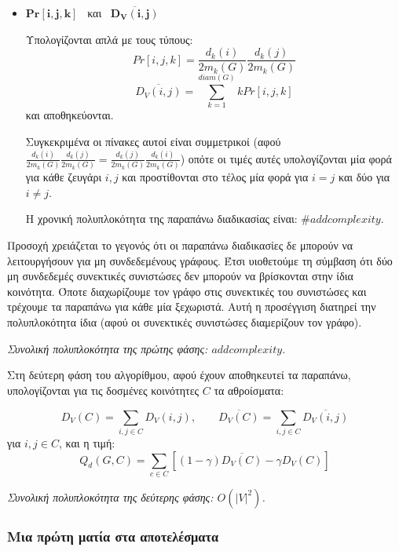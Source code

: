 \documentclass[12pt, letterpaper]{article}
\begin{document}
\begin{itemize}
    \item $\mathbf{Pr[i,j,k]}$  \ και \   $\mathbf{\overline{D_V(i,j)}}$
    
    Υπολογίζονται απλά με τους τύπους:
    \[ Pr[i,j,k] = \frac{d_k(i)}{2m_k(G)} \frac{d_k(j)}{2m_k(G)} \]
    \[ \overline{D_V(i,j)} = \sum_{k=1}^{diam(G)} k Pr[i,j,k] \]
    και αποθηκεύονται. 
    
    Συγκεκριμένα οι πίνακες αυτοί είναι συμμετρικοί (αφού 
    $\frac{d_k(i)}{2m_k(G)} \frac{d_k(j)}{2m_k(G)} = \frac{d_k(j)}{2m_k(G)} \frac{d_k(i)}{2m_k(G)}$)
    οπότε οι τιμές αυτές υπολογίζονται μία φορά για κάθε ζευγάρι $i,j$ και προστίθονται
    στο τέλος μία φορά για $i=j$ και δύο για $i \neq j$.
    
    Η χρονική πολυπλοκότητα της παραπάνω διαδικασίας είναι:
    $\#add complexity$.

    

\end{itemize}

Προσοχή χρειάζεται το γεγονός ότι οι παραπάνω διαδικασίες δε μπορούν 
να λειτουργήσουν για μη συνδεδεμένους γράφους. Έτσι υιοθετούμε τη σύμβαση ότι 
δύο μη συνδεδεμές συνεκτικές συνιστώσες δεν μπορούν να βρίσκονται στην ίδια 
κοινότητα. Όποτε διαχωρίζουμε τον γράφο στις συνεκτικές του συνιστώσες και 
τρέχουμε τα παραπάνω για κάθε μία ξεχωριστά. Αυτή η προσέγγιση διατηρεί την 
πολυπλοκότητα ίδια (αφού οι συνεκτικές συνιστώσες διαμερίζουν τον γράφο).

\bigskip

\emph{Συνολική πολυπλοκότητα της πρώτης φάσης: $add complexity$.}

\bigskip

Στη δεύτερη φάση του αλγορίθμου, αφού έχουν αποθηκευτεί τα παραπάνω, 
υπολογίζονται για τις δοσμένες κοινότητες $C$ τα αθροίσματα: 


\[ D_V(C) = \sum_{i,j \in C} D_V(i,j), \qquad \overline{ D_V(C)  } =  \sum_{i,j \in C} \overline{ D_V(i,j) }\]
 για $i,j \in C$, και η τιμή:
\[ Q_d(G,C) = \sum_{c \in C} [(1 - \gamma)\overline{ D_V(C) } - \gamma D_V(C) ]\]


\bigskip

\emph{Συνολική πολυπλοκότητα της δεύτερης φάσης: $O(|V|^2)$.}

\bigskip







\subsubsection{Μια πρώτη ματία στα αποτελέσματα}
\end{document}
